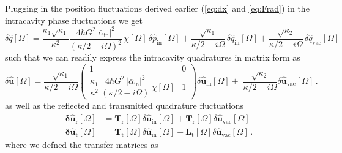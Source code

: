 Plugging in the position fluctuations derived earlier (\eqref{eq:dx} and \eqref{eq:Frad}) in the intracavity phase fluctuations we get
\begin{equation}
\delta \hat{q}[\Omega] =  \frac{\kappa_{\mathrm{1}}\sqrt{\kappa_1}}{\kappa^2} \frac{4\hbar G^2|\bar \alpha_{\textrm{in}}|^2}{(\kappa/2 - i\Omega)^2}  \,  \chi[\Omega] \, \delta \hat{p}_{\mathrm{in}}[\Omega] 
+\frac{\sqrt{\kappa_{\mathrm{1}}}}{\kappa/2 - i\Omega} \, \delta \hat{q}_{\mathrm{in}}[\Omega]  +\frac{\sqrt{\kappa_{\mathrm{2}}}}{\kappa/2 - i\Omega} \, \delta \hat{q}_{\mathrm{vac}}[\Omega] 
\end{equation}
such that we can readily express the intracavity quadratures in matrix form as
\begin{equation}
\delta\mathbf{\hat{\mathbf u}} [\Omega]
=
\dfrac{\sqrt{\kappa_{1}}}{\kappa/2-i\Omega}
\left(
\begin{array}{cc}
1 & 0\\[6pt]
\dfrac{\kappa_{1}}{\kappa^{2}}\,
\dfrac{4\hbar G^{2}\,|\bar\alpha_{\mathrm{in}}|^{2}}{(\kappa/2-i\Omega)}\,
\chi[\Omega] & 1
\end{array}
\right)
\delta\mathbf{\hat{\mathbf u}} _{\mathrm{in}}[\Omega] +\;
\dfrac{\sqrt{\kappa_{2}}}{\kappa/2-i\Omega}
\delta\mathbf{\hat{\mathbf u}} _{\mathrm{vac}}[\Omega] \, .
\end{equation}
as well as the reflected and transmitted quadrature fluctuations 
\begin{equation}
\begin{split}
\mathbf{\delta \hat{u}_{\mathrm{r}}}[\Omega] &= 
\mathbf{T}_{\mathrm{r}}[\Omega]
\delta\hat{\mathbf u}_{\mathrm{in}}[\Omega] + 
\mathbf{T}_{\mathrm{r}}[\Omega]
\delta\hat{\mathbf u}_{\mathrm{vac}}[\Omega] \, \\ 
\mathbf{\delta \hat{u}_{\mathrm{t}}}[\Omega] &= \mathbf{T}_{\mathrm{t}}[\Omega]  \delta\hat{\mathbf u}_{\mathrm{in}}[\Omega] +
\mathbf{L}_{\mathrm{t}}[\Omega]
\delta\hat{\mathbf u}_{\mathrm{vac}}[\Omega] \, .
\end{split}
\end{equation}
 where we defned the transfer matrices as 
